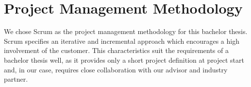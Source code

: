 \section{Project Management Methodology}

We chose Scrum as the project management methodology for this bachelor thesis. Scrum specifies an iterative and incremental approach which encourages a high involvement of the customer. This characteristics suit the requirements of a bachelor thesis well,
as it provides only a short project definition at project start and, in our case, requires close collaboration with our advisor and industry partner.
